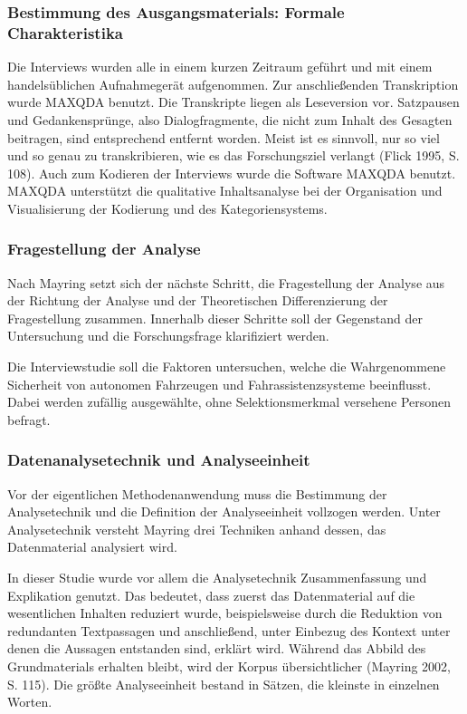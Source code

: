 \documentclass[12pt]{article}
\begin{document}
\subsubsection*{Bestimmung des Ausgangsmaterials: Formale Charakteristika}
Die Interviews wurden alle in einem kurzen Zeitraum geführt und mit einem handelsüblichen Aufnahmegerät aufgenommen. Zur anschließenden Transkription wurde MAXQDA benutzt. Die Transkripte liegen als Leseversion vor. Satzpausen und Gedankensprünge, also Dialogfragmente, die nicht zum Inhalt des Gesagten beitragen, sind entsprechend entfernt worden. Meist ist es sinnvoll, nur so viel und so genau zu transkribieren, wie es das Forschungsziel verlangt (Flick 1995, S. 108).
Auch zum Kodieren der Interviews wurde die Software MAXQDA benutzt. MAXQDA unterstützt die qualitative Inhaltsanalyse bei der Organisation und Visualisierung der Kodierung und des Kategoriensystems.

\subsubsection*{Fragestellung der Analyse}
Nach Mayring setzt sich der nächste Schritt, die \glq Fragestellung der Analyse\grq{} aus der \glq Richtung der Analyse\grq{} und der \glq Theoretischen Differenzierung der Fragestellung\grq{} zusammen. Innerhalb dieser Schritte soll der Gegenstand der Untersuchung und die Forschungsfrage klarifiziert werden.

Die Interviewstudie soll die Faktoren untersuchen, welche die Wahrgenommene Sicherheit von autonomen Fahrzeugen und Fahrassistenzsysteme beeinflusst. Dabei werden zufällig ausgewählte, ohne Selektionsmerkmal versehene Personen befragt.

\subsubsection*{Datenanalysetechnik und Analyseeinheit}
Vor der eigentlichen Methodenanwendung muss die \glq Bestimmung der Analysetechnik\grq{} und die \glq Definition der Analyseeinheit\grq{} vollzogen werden. Unter Analysetechnik versteht Mayring drei Techniken anhand dessen, das Datenmaterial analysiert wird.

In dieser Studie wurde vor allem die Analysetechnik \glq Zusammenfassung\grq{} und \glq Explikation\grq{} genutzt. Das bedeutet, dass zuerst das Datenmaterial auf die wesentlichen Inhalten reduziert wurde, beispielsweise durch die Reduktion von redundanten Textpassagen und anschließend, unter Einbezug des Kontext unter denen die Aussagen entstanden sind, erklärt wird. Während das \glq Abbild des Grundmaterials\grq{} erhalten bleibt, wird der Korpus übersichtlicher (Mayring 2002, S. 115). Die größte Analyseeinheit bestand in Sätzen, die kleinste in einzelnen Worten.
\end{document}
